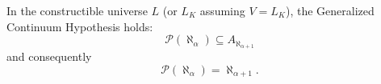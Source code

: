 In the constructible universe $L$ (or $L_K$ assuming $V = L_K$), the Generalized Continuum Hypothesis holds:
$$\mathcal{P}(\aleph_\alpha) \subseteq A_{\aleph_{\alpha+1}}$$
and consequently
$$\mathcal{P}(\aleph_\alpha) = \aleph_{\alpha+1}.$$
